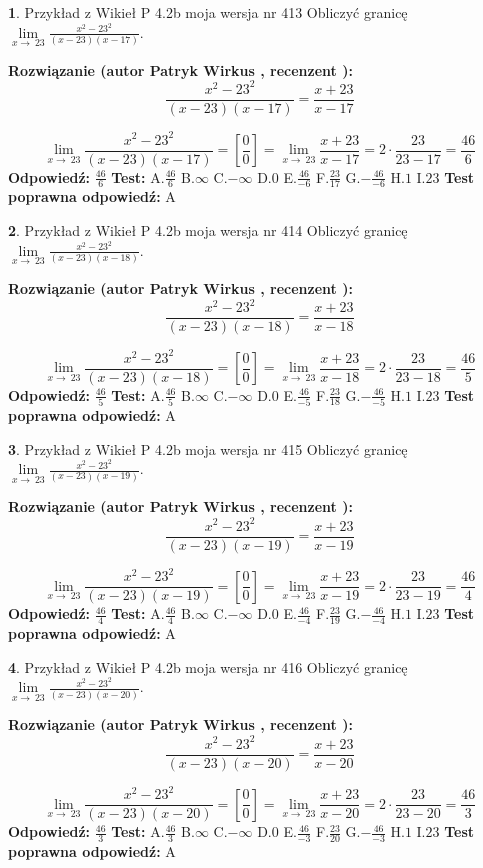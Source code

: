 \documentclass[12pt, a4paper]{article}
\theoremstyle{definition} %
\newtheorem{zad}{}
\newcommand{\zadStart}[1]{\begin{zad}#1\newline}
\newcommand{\zadStop}{\end{zad}}
\newcommand{\rozwStart}[2]{\noindent \textbf{Rozwiązanie (autor #1 , recenzent #2): }\newline}
\newcommand{\rozwStop}{\newline}
\newcommand{\odpStart}{\noindent \textbf{Odpowiedź:}\newline}
\newcommand{\odpStop}{\newline}
\newcommand{\testStart}{\noindent \textbf{Test:}\newline}
\newcommand{\testStop}{\newline}
\newcommand{\kluczStart}{\noindent \textbf{Test poprawna odpowiedź:}\newline}
\newcommand{\kluczStop}{\newline}
\begin{document}
\zadStart{Przykład z Wikieł P 4.2b moja wersja nr 413}
Obliczyć granicę $\lim\limits_{x\to\ 23}\frac{x^{2}-23^{2}}{(x-23)(x-17)}$.
\zadStop
\rozwStart{Patryk Wirkus}{}
$$\frac{x^{2}-23^{2}}{(x-23)(x-17)}=\frac{x+23}{x-17}$$

$$\lim\limits_{x\to\ 23}\frac{x^{2}-23^{2}}{(x-23)(x-17)}=[\frac{0}{0}]=\lim\limits_{x\to\ 23}\frac{x+23}{x-17}=2 \cdot \frac{23}{23-17} = \frac{46}{6}$$
\rozwStop
\odpStart
$\frac{46}{6}$
\odpStop
\testStart
A.$\frac{46}{6}$
B.$\infty$
C.$-\infty$
D.$0$
E.$\frac{46}{-6}$
F.$\frac{23}{17}$
G.$-\frac{46}{-6}$
H.$1$
I.$23$
\testStop
\kluczStart
A
\kluczStop



\zadStart{Przykład z Wikieł P 4.2b moja wersja nr 414}
Obliczyć granicę $\lim\limits_{x\to\ 23}\frac{x^{2}-23^{2}}{(x-23)(x-18)}$.
\zadStop
\rozwStart{Patryk Wirkus}{}
$$\frac{x^{2}-23^{2}}{(x-23)(x-18)}=\frac{x+23}{x-18}$$

$$\lim\limits_{x\to\ 23}\frac{x^{2}-23^{2}}{(x-23)(x-18)}=[\frac{0}{0}]=\lim\limits_{x\to\ 23}\frac{x+23}{x-18}=2 \cdot \frac{23}{23-18} = \frac{46}{5}$$
\rozwStop
\odpStart
$\frac{46}{5}$
\odpStop
\testStart
A.$\frac{46}{5}$
B.$\infty$
C.$-\infty$
D.$0$
E.$\frac{46}{-5}$
F.$\frac{23}{18}$
G.$-\frac{46}{-5}$
H.$1$
I.$23$
\testStop
\kluczStart
A
\kluczStop



\zadStart{Przykład z Wikieł P 4.2b moja wersja nr 415}
Obliczyć granicę $\lim\limits_{x\to\ 23}\frac{x^{2}-23^{2}}{(x-23)(x-19)}$.
\zadStop
\rozwStart{Patryk Wirkus}{}
$$\frac{x^{2}-23^{2}}{(x-23)(x-19)}=\frac{x+23}{x-19}$$

$$\lim\limits_{x\to\ 23}\frac{x^{2}-23^{2}}{(x-23)(x-19)}=[\frac{0}{0}]=\lim\limits_{x\to\ 23}\frac{x+23}{x-19}=2 \cdot \frac{23}{23-19} = \frac{46}{4}$$
\rozwStop
\odpStart
$\frac{46}{4}$
\odpStop
\testStart
A.$\frac{46}{4}$
B.$\infty$
C.$-\infty$
D.$0$
E.$\frac{46}{-4}$
F.$\frac{23}{19}$
G.$-\frac{46}{-4}$
H.$1$
I.$23$
\testStop
\kluczStart
A
\kluczStop



\zadStart{Przykład z Wikieł P 4.2b moja wersja nr 416}
Obliczyć granicę $\lim\limits_{x\to\ 23}\frac{x^{2}-23^{2}}{(x-23)(x-20)}$.
\zadStop
\rozwStart{Patryk Wirkus}{}
$$\frac{x^{2}-23^{2}}{(x-23)(x-20)}=\frac{x+23}{x-20}$$

$$\lim\limits_{x\to\ 23}\frac{x^{2}-23^{2}}{(x-23)(x-20)}=[\frac{0}{0}]=\lim\limits_{x\to\ 23}\frac{x+23}{x-20}=2 \cdot \frac{23}{23-20} = \frac{46}{3}$$
\rozwStop
\odpStart
$\frac{46}{3}$
\odpStop
\testStart
A.$\frac{46}{3}$
B.$\infty$
C.$-\infty$
D.$0$
E.$\frac{46}{-3}$
F.$\frac{23}{20}$
G.$-\frac{46}{-3}$
H.$1$
I.$23$
\testStop
\kluczStart
A
\kluczStop
\end{document}
